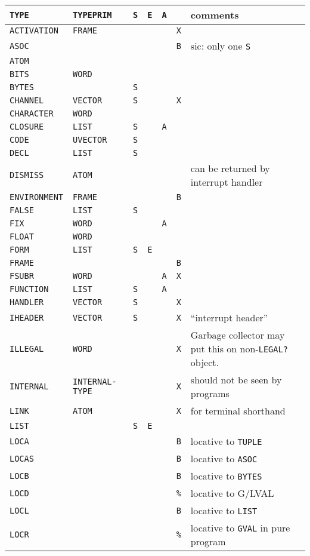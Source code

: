 \documentclass[a4paper]{scrbook}
\begin{document}
\begin{longtable}[]{@{}lllllll@{}}
\toprule
\texttt{TYPE} & \texttt{TYPEPRIM} & \texttt{S} & \texttt{E} & \texttt{A} & & comments\tabularnewline
\midrule
\endhead
\texttt{ACTIVATION} & \texttt{FRAME} & & & & \texttt{X} &\tabularnewline
\texttt{ASOC} & & & & & \texttt{B} & sic: only one \texttt{S}\tabularnewline
\texttt{ATOM} & & & & & &\tabularnewline
\texttt{BITS} & \texttt{WORD} & & & & &\tabularnewline
\texttt{BYTES} & & \texttt{S} & & & &\tabularnewline
\texttt{CHANNEL} & \texttt{VECTOR} & \texttt{S} & & & \texttt{X} &\tabularnewline
\texttt{CHARACTER} & \texttt{WORD} & & & & &\tabularnewline
\texttt{CLOSURE} & \texttt{LIST} & \texttt{S} & & \texttt{A} & &\tabularnewline
\texttt{CODE} & \texttt{UVECTOR} & \texttt{S} & & & &\tabularnewline
\texttt{DECL} & \texttt{LIST} & \texttt{S} & & & &\tabularnewline
\texttt{DISMISS} & \texttt{ATOM} & & & & & can be returned by interrupt handler\tabularnewline
\texttt{ENVIRONMENT} & \texttt{FRAME} & & & & \texttt{B} &\tabularnewline
\texttt{FALSE} & \texttt{LIST} & \texttt{S} & & & &\tabularnewline
\texttt{FIX} & \texttt{WORD} & & & \texttt{A} & &\tabularnewline
\texttt{FLOAT} & \texttt{WORD} & & & & &\tabularnewline
\texttt{FORM} & \texttt{LIST} & \texttt{S} & \texttt{E} & & &\tabularnewline
\texttt{FRAME} & & & & & \texttt{B} &\tabularnewline
\texttt{FSUBR} & \texttt{WORD} & & & \texttt{A} & \texttt{X} &\tabularnewline
\texttt{FUNCTION} & \texttt{LIST} & \texttt{S} & & \texttt{A} & &\tabularnewline
\texttt{HANDLER} & \texttt{VECTOR} & \texttt{S} & & & \texttt{X} &\tabularnewline
\texttt{IHEADER} & \texttt{VECTOR} & \texttt{S} & & & \texttt{X} & ``interrupt header''\tabularnewline
\texttt{ILLEGAL} & \texttt{WORD} & & & & \texttt{X} & Garbage collector may put this on non-\texttt{LEGAL?}
object.\tabularnewline
\texttt{INTERNAL}\index{\texttt{INTERNAL}} & \texttt{INTERNAL-TYPE}\index{\texttt{INTERNAL-TYPE}} & & & & \texttt{X} &
should not be seen by programs\tabularnewline
\texttt{LINK} & \texttt{ATOM} & & & & \texttt{X} & for terminal shorthand\tabularnewline
\texttt{LIST} & & \texttt{S} & \texttt{E} & & &\tabularnewline
\texttt{LOCA} & & & & & \texttt{B} & locative to \texttt{TUPLE}\tabularnewline
\texttt{LOCAS} & & & & & \texttt{B} & locative to \texttt{ASOC}\tabularnewline
\texttt{LOCB} & & & & & \texttt{B} & locative to \texttt{BYTES}\tabularnewline
\texttt{LOCD} & & & & & \texttt{\%} & locative to G/LVAL\tabularnewline
\texttt{LOCL} & & & & & \texttt{B} & locative to \texttt{LIST}\tabularnewline
\texttt{LOCR} & & & & & \texttt{\%} & locative to \texttt{GVAL} in pure program\tabularnewline

\end{longtable}
\end{document}
